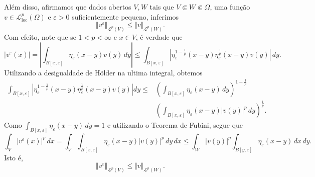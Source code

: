 \documentclass[a4paper, 11pt]{book}
\theoremstyle{definition}
\newcommand{\cL}{\mathcal{L}}
\newcommand{\loc}{\mathrm{loc}}
\begin{document}
\begin{prf}
    Além disso, afirmamos que dados abertos $V, W$ tais que $V \Subset W \Subset \Omega$, uma função $v \in \cL^p_\loc(\Omega)$ e $\varepsilon > 0$ suficientemente pequeno, inferimos
    \begin{equation}
        \Vert v^\varepsilon \Vert_{\cL^p(V)} \leqslant \Vert v \Vert_{\cL^p(W)}.
    \end{equation}
    Com efeito, note que se $1 < p < \infty$ e $x \in V$, é verdade que
    \[
        |v^\varepsilon(x)| = \left| \int_{B[x,\varepsilon]} \eta_\varepsilon(x-y) v (y) \,dy \right| \leqslant \int_{B[x,\varepsilon]} \left| \eta_\varepsilon^{1-\frac{1}{p}}(x-y) \eta_\varepsilon^{\frac{1}{p}}(x-y) v(y) \right| \,dy.
    \]
    Utilizando a desigualdade de Hölder na ultima integral, obtemos
    \[
        \begin{aligned}
            \int_{B[x,\varepsilon]} \left| \eta_\varepsilon^{1-\frac{1}{p}}(x-y) \eta_\varepsilon^{\frac{1}{p}}(x-y) v(y) \right|dy \leqslant &\left( \int_{B[x,\varepsilon]} \eta_\varepsilon (x-y) \,dy\right)^{\!1-\frac{1}{p}}\\ &\left( \int_{B[x,\varepsilon]} \eta_\varepsilon(x-y) |v(y)|^p \,dy \right)^{\frac{1}{p}}.
        \end{aligned}
    \]
    Como $\int_{B[x,\varepsilon]} \eta_\varepsilon(x-y) \,dy = 1$ e utilizando o Teorema de Fubini, segue que
    \[
        \int_V |v^\varepsilon(x)|^p \,dx = \int_V \int_{B[x,\varepsilon]} \eta_\varepsilon(x-y) |v(y)|^p \,dy \,dx \leqslant \int_W |v(y)|^p \int_{B[y,\varepsilon]} \eta_\varepsilon(x-y) \,dx \,dy.
    \]
    Isto é,
    \[
        \Vert v^\varepsilon \Vert_{\cL^p(V)} \leqslant \Vert v \Vert_{\cL^p(W)}.
    \]


\end{prf}
\end{document}
